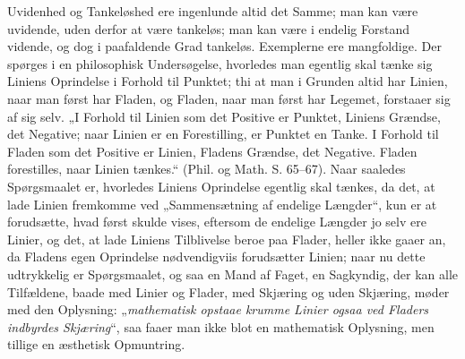 \documentclass[12pt,a4paper]{book}
\begin{document}
Uvidenhed og Tankeløshed ere ingenlunde altid det Samme;
man kan være uvidende, uden derfor at være tankeløs; man
kan være i endelig Forstand vidende, og dog i paafaldende
Grad tankeløs. Exemplerne ere mangfoldige. Der spørges
i en philosophisk Undersøgelse, hvorledes man egentlig skal
tænke sig Liniens Oprindelse i Forhold til Punktet; thi at
man i Grunden altid har Linien, naar man først har Fladen,
og Fladen, naar man først har Legemet, forstaaer sig af sig
selv. „I Forhold til Linien som det Positive er Punktet,
Liniens Grændse, det Negative; naar Linien er en Forestilling,
er Punktet en Tanke. I Forhold til Fladen som
det Positive er Linien, Fladens Grændse, det Negative.
Fladen forestilles, naar Linien tænkes.“ (Phil. og Math. S.
65--67). Naar saaledes Spørgsmaalet er, hvorledes Liniens
Oprindelse egentlig skal tænkes, da det, at lade Linien fremkomme
ved „Sammensætning af endelige Længder“, kun er at
forudsætte, hvad først skulde vises, eftersom de endelige Længder
jo selv ere Linier, og det, at lade Liniens Tilblivelse beroe
paa Flader, heller ikke gaaer an, da Fladens egen Oprindelse
nødvendigviis forudsætter Linien; naar nu dette udtrykkelig
er Spørgsmaalet, og saa en Mand af Faget, en
Sagkyndig, der kan alle Tilfældene, baade med Linier og
Flader, med Skjæring og uden Skjæring, møder med den
Oplysning: „\emph{mathematisk opstaae krumme Linier
ogsaa ved Fladers indbyrdes Skjæring}“, saa faaer
man ikke blot en mathematisk Oplysning, men tillige en
æsthetisk Opmuntring.
\end{document}
